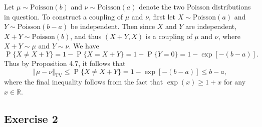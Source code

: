 \documentclass[12pt]{article}
\DeclareMathOperator{\Prob}{P}
\begin{document}
Let $\mu \sim \mathrm{Poisson}(b)$ and $\nu \sim \mathrm{Poisson}(a)$ denote the two Poisson distributions in question. To construct a coupling of $\mu$ and $\nu$, first let $X \sim \mathrm{Poisson}(a)$ and $Y \sim \mathrm{Poisson}(b-a)$ be independent. Then since $X$ and $Y$ are independent, $X + Y \sim \mathrm{Poisson}(b)$, and thus $(X + Y, X)$ is a coupling of $\mu$ and $\nu$, where $X + Y \sim \mu$ and $Y \sim \nu$. We have
\begin{equation*}
\Prob\{X \neq X + Y\} = 1 - \Prob\{X = X + Y\} = 1 - \Prob\{Y = 0\} = 1 - \exp[-(b-a)].
\end{equation*}
Thus by Proposition 4.7, it follows that
\begin{equation*}
\Vert \mu - \nu \Vert_\mathrm{TV} \leq \Prob\{X \neq X + Y\} = 1 - \exp[-(b-a)] \leq b - a,
\end{equation*}
where the final inequality follows from the fact that $\exp(x) \geq 1 + x$ for any $x \in \mathbb{R}$.

\subsection*{Exercise 2}
\end{document}
